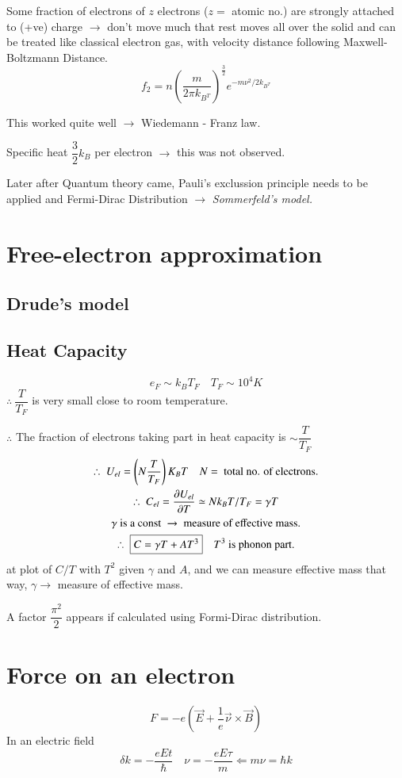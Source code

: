 Some fraction of electrons of $z$ electrons ($z=$ atomic no.) are strongly attached to (+ve) charge $\to$ don't move much that rest moves all over the solid and can be treated like classical electron gas, with velocity distance following Maxwell- Boltzmann Distance.
$$
f_{2}=n\left(\dfrac{m}{2\pi k_{B^{T}}}\right)^{\frac{3}{2}}e^{-m\nu^{2}/2k_{B^{T}}}
$$

This worked quite well $\to$ Wiedemann - Franz law.

Specific heat $\dfrac{3}{2}k_{B}$ per electron $\to$ this was not observed.

Later after Quantum theory came, Pauli's exclussion principle needs to be applied and Fermi-Dirac Distribution $\to$ {\em Sommerfeld's model.}

\section*{Free-electron approximation}

\subsection*{Drude's model}

\subsection*{Heat Capacity}
$$
e_{F}\sim k_{B}T_{F}\quad T_{F}\sim 10^{4}K
$$
$\therefore \ \dfrac{T}{T_{F}}$ is very small close to room temperature.

$\therefore$ The fraction of electrons taking part in heat capacity is $\sim \dfrac{T}{T_{F}}$
\begin{gather*}
\therefore \ U_{el}=\left(N\dfrac{T}{T_{F}}\right)K_{B}T\quad N= \text{ total no. of electrons.}\\
\therefore \ C_{el}=\dfrac{\partial U_{el}}{\partial T}\simeq N k_{B}T/T_{F}=\gamma T\\
\gamma \text{ is a const } \to \text{ measure of effective mass.}\\
\therefore \ \fbox{$C=\gamma T+AT^{3}$}\quad T^{3} \text{ is phonon part.}
\end{gather*}
at plot of $C/T$ with $T^{2}$ given $\gamma$ and $A$, and we can measure effective mass that way, $\gamma\to$ measure of effective mass.

A factor $\dfrac{\pi^{2}}{2}$ appears if calculated using Formi-Dirac distribution.

\section*{Force on an electron}
$$
F=-e(\overrightarrow{E}+\dfrac{1}{e}\overrightarrow{\nu}\times \overrightarrow{B})
$$
In an electric field
$$
\delta k=-\dfrac{eEt}{\hbar}\quad \nu=-\dfrac{eE\tau}{m}\Leftarrow m\nu=\hbar k
$$

